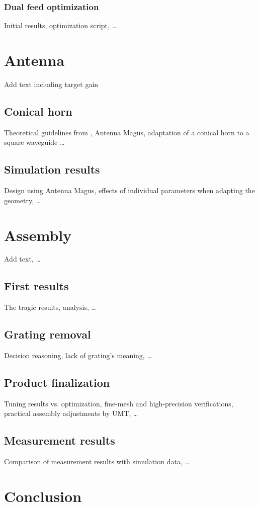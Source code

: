\documentclass[11pt,a4paper,twoside,openany]{report}
\begin{document}
\subsection{Dual feed optimization}
Initial results, optimization script, \dots

\chapter{Antenna}
\label{chapter:antenna}
Add text including target gain

\section{Conical horn}
Theoretical guidelines from \parencite{aboserwal-et-al:conical-horn-gain-and-amplitude-patterns}, Antenna Magus, adaptation of a conical horn to a square waveguide \dots

\section{Simulation results}
Design using Antenna Magus, effects of individual parameters when adapting the geometry, \dots

\newpage
\chapter{Assembly}
\label{chapter:assembly}
Add text, \dots

\section{First results}
The tragic results, analysis, \dots

\section{Grating removal}
Decision reasoning, lack of grating's meaning, \dots

\section{Product finalization}
Tuning results vs. optimization, fine-mesh and high-precision verifications, practical assembly adjustments by UMT, \dots

\section{Measurement results}
Comparison of measurement results with simulation data, \dots

\chapter*{Conclusion}
\label{chap:conclusion}

\lipsum[10-13]

\printnomenclature

\printbibliography[heading=bibintoc]

\printindex
\end{document}
